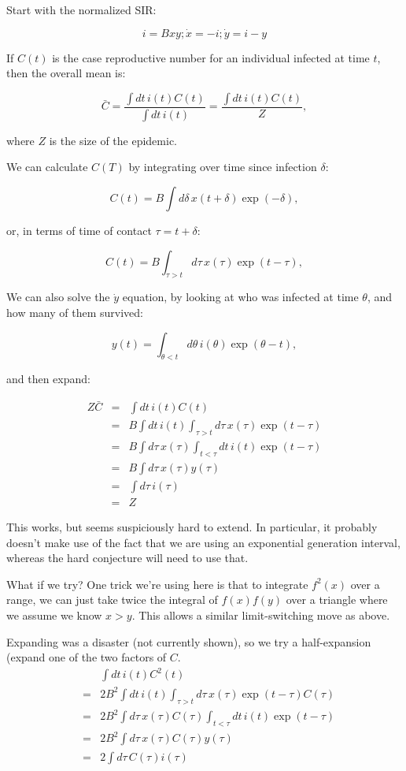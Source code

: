 \documentclass[12pt]{article}
\begin{document}
Start with the normalized SIR:

$$ i = Bxy; \dot x = -i; \dot y = i-y $$

If $C(t)$ is the case reproductive number for an individual infected at time $t$, then the overall mean is:

$$
	\bar C 
	= \frac{\int{dt\, i(t) C(t)}}{\int{dt\, i(t)}}
	= \frac{\int{dt\, i(t) C(t)}}{Z}, 
$$

where $Z$ is the size of the epidemic.

We can calculate $C(T)$ by integrating over time since infection $\delta$:

$$C(t) = B \int{d\delta\, x(t+\delta) \exp(-\delta)}, $$

or, in terms of time of contact $\tau=t+\delta$:

$$C(t) = B \int_{\tau>t}{d\tau\, x(\tau) \exp(t-\tau)}, $$

We can also solve the $\dot y$ equation, by looking at who was infected at time $\theta$, and how many of them survived:

$$ y(t) = \int_{\theta<t}{d\theta\, i(\theta)\exp(\theta-t)},$$

and then expand:

\begin{eqnarray}
	Z \bar C
	&=& \int{dt\, i(t) C(t)}
	\\ &=& B \int{dt\, i(t) \int_{\tau>t}{d\tau\, x(\tau) \exp(t-\tau)}}
	\\ &=& B \int{d\tau\, x(\tau) \int_{t<\tau}dt\, i(t) \exp(t-\tau)}
	\\ &=& B \int{d\tau\, x(\tau) y(\tau)}
	\\ &=& \int{d\tau\, i(\tau)}
	\\ &=& Z
\end{eqnarray}

This works, but seems suspiciously hard to extend. In particular, it probably doesn't make use of the fact that we are using an exponential generation interval, whereas the hard conjecture will need to use that.

What if we try? One trick we're using here is that to integrate $f^2(x)$ over a range, we can just take twice the integral of $f(x)f(y)$ over a triangle where we assume we know $x>y$. This allows a similar limit-switching move as above.

Expanding was a disaster (not currently shown), so we try a half-expansion (expand one of the two factors of $C$.
\begin{eqnarray}
	&& \int{dt\, i(t) C^2(t)}
	\\ &=& 2B^2 \int{dt\, i(t) \int_{\tau>t}{d\tau\, x(\tau) \exp(t-\tau) C(\tau)}}
	\\ &=& 2B^2 \int{d\tau\, x(\tau) C(\tau) \int_{t<\tau}{dt\, i(t) \exp(t-\tau)}}
	\\ &=& 2B^2 \int{d\tau\, x(\tau) C(\tau) y(\tau)}
	\\ &=& 2 \int{d\tau\, C(\tau) i(\tau)}
\end{eqnarray}
\end{document}

